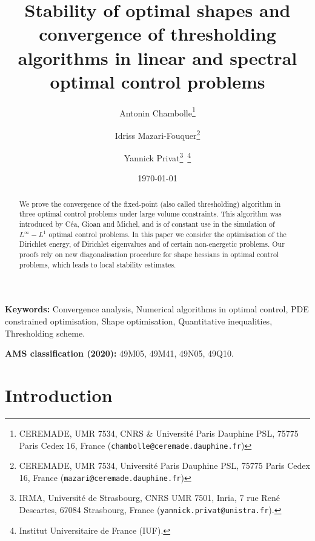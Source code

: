 \documentclass{article}
\numberwithin{equation}{section}
\begin{document}
%
\title{\sf Stability of optimal shapes and convergence of thresholding algorithms in linear and spectral optimal control problems}


\author{Antonin Chambolle\footnote{CEREMADE, UMR 7534, CNRS \& Universit\'e Paris Dauphine PSL, 75775 Paris Cedex 16, France
(\texttt{chambolle@ceremade.dauphine.fr})}
\and Idriss Mazari-Fouquer\footnote{CEREMADE, UMR 7534,  Universit\'e Paris Dauphine PSL, 75775 Paris Cedex 16, France
(\texttt{mazari@ceremade.dauphine.fr})}
\and Yannick Privat\footnote{IRMA, Universit\'e de Strasbourg, CNRS UMR 7501, Inria, 7 rue Ren\'e Descartes, 67084 Strasbourg, France (\texttt{yannick.privat@unistra.fr}).}~\footnote{Institut Universitaire de France (IUF).}}
\date{\today}

 






\maketitle

\begin{abstract}
We prove the convergence of the fixed-point (also called thresholding) algorithm in three optimal control problems under large volume constraints. This algorithm was introduced by C\'ea, Gioan and Michel, and is of constant use in the simulation of $L^\infty-L^1$ optimal control problems. In this paper we consider the optimisation of the Dirichlet energy, of Dirichlet eigenvalues and of certain non-energetic problems. Our proofs rely on new diagonalisation procedure for shape hessians in optimal control problems, which leads to local stability estimates.
\end{abstract}

\noindent\textbf{Keywords:} Convergence analysis, Numerical algorithms in optimal control, PDE constrained optimisation, Shape optimisation, Quantitative inequalities, Thresholding scheme.

\medskip

\noindent\textbf{AMS classification (2020): }49M05, 49M41, 49N05, 49Q10.



\section{Introduction}
\end{document}
